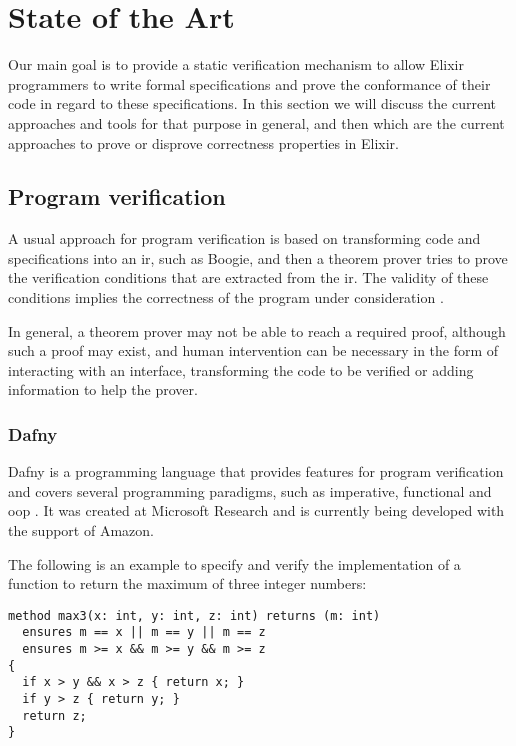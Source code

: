 \chapter{State of the Art}
\label{cap:stateOfTheArt}


Our main goal is to provide a static verification mechanism to allow Elixir
programmers to write formal specifications and prove the conformance of their 
code in regard to these specifications. In this section we will discuss the
current approaches and tools for that purpose in general, and then which are the
current approaches to prove or disprove correctness properties in Elixir.

\section{Program verification}

A usual approach for program verification is based on transforming code and
specifications into an \gls{ir}, such as Boogie, and then a theorem prover tries
to prove the verification conditions that are extracted from the \gls{ir}. The
validity of these conditions implies the correctness of the program under
consideration \citep{Boogie2}.

In general, a theorem prover may not be able to reach a required proof, although
such a proof may exist, and human intervention can be necessary in the form of
interacting with an interface, transforming the code to be verified or adding
information to help the prover.

\subsection{Dafny}

Dafny is a programming language that provides features for program verification
and covers several programming paradigms, such as imperative, functional and
\gls{oop} \citep{DafnyManual}.  It was created at Microsoft Research and is
currently being developed with the support of Amazon.

The following is an example to specify and verify the implementation of a
function to return the maximum of three integer numbers:

\begin{verbatim}
method max3(x: int, y: int, z: int) returns (m: int)
  ensures m == x || m == y || m == z
  ensures m >= x && m >= y && m >= z
{
  if x > y && x > z { return x; }
  if y > z { return y; }
  return z;
}
\end{verbatim}

